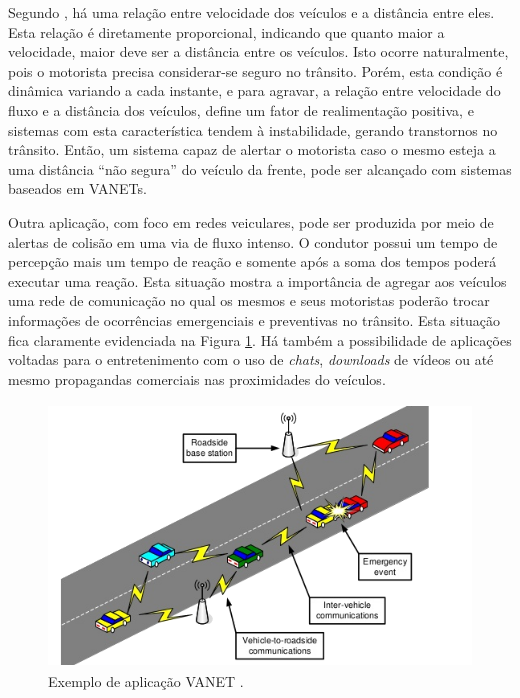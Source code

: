 \documentclass[
	12pt,				%
	oneside,			%
	a4paper,			%
	english,			%
	brazil				%
	]{abntex2ppgsi}
\begin{document}
Segundo , há uma relação entre velocidade dos veículos e a distância entre eles. Esta relação é diretamente proporcional, indicando que quanto maior a velocidade, maior deve ser a distância entre os veículos. Isto ocorre naturalmente, pois o motorista precisa considerar-se seguro no trânsito. Porém, esta condição é dinâmica variando a cada instante, e para agravar, a relação entre velocidade do fluxo e a distância dos veículos, define um fator de realimentação positiva, e sistemas com esta característica tendem à instabilidade, gerando transtornos no trânsito. Então, um sistema capaz de alertar o motorista caso o mesmo esteja a uma distância ``não segura'' do veículo da frente, pode ser alcançado com sistemas baseados em VANETs. 

Outra aplicação, com foco em redes veiculares, pode ser produzida por meio de alertas de colisão em uma via de fluxo intenso. O condutor possui um tempo de percepção mais um tempo de reação e somente após a soma dos tempos poderá executar uma reação. Esta situação mostra a importância de agregar aos veículos uma rede de comunicação no qual os mesmos e seus motoristas poderão trocar informações de ocorrências emergenciais e preventivas no trânsito. Esta situação fica claramente evidenciada na Figura \ref{fig:vanetqian}. Há também a possibilidade de aplicações voltadas para o entretenimento com o uso de \textit{chats}, \textit{downloads} de vídeos ou até mesmo propagandas comerciais nas proximidades do veículos. 

\begin{figure}[h!]
	\centering
	\includegraphics [width=12cm,height=7cm] {images/vanet_qian.png}
	\caption{Exemplo de aplicação VANET \cite{qian2008secure}.}
	\label{fig:vanetqian}
\end{figure}
\end{document}

